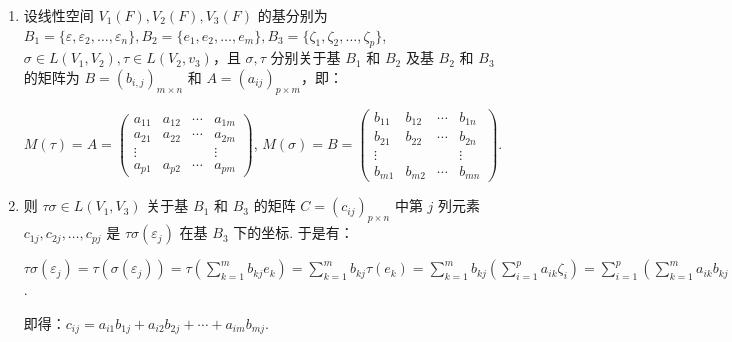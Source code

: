\begin{enumerate}
    \item 设线性空间 $V_1(F), V_2(F), V_3(F)$ 的基分别为 $B_1=\{\varepsilon, \varepsilon_2,\ldots,\varepsilon_n\},B_2=\{e_1,e_2,\ldots,e_m\},B_3=\{\zeta_1,\zeta_2,\ldots,\zeta_p\}$, $\sigma \in L(V_1,V_2), \tau \in L(V_2,v_3)$，且 $\sigma, \tau$ 分别关于基 $B_1$ 和 $B_2$ 及基 $B_2$ 和 $B_3$ 的矩阵为 $B=(b_{i,j})_{m \times n}$ 和 $A=(a_{ij})_{p\times m}$，即：

          $M(\tau)=A=\begin{pmatrix}
                  a_{11} & a_{12} & \cdots & a_{1m} \\
                  a_{21} & a_{22} & \cdots & a_{2m} \\
                  \vdots &        &        & \vdots \\
                  a_{p1} & a_{p2} & \cdots & a_{pm}
              \end{pmatrix}$,
          $M(\sigma)=B=\begin{pmatrix}
                  b_{11} & b_{12} & \cdots & b_{1n} \\
                  b_{21} & b_{22} & \cdots & b_{2n} \\
                  \vdots &        &        & \vdots \\
                  b_{m1} & b_{m2} & \cdots & b_{mn}
              \end{pmatrix}$.

    \item 则 $\tau\sigma \in L(V_1,V_3)$ 关于基 $B_1$ 和 $B_3$ 的矩阵 $C=(c_{ij})_{p\times n}$ 中第 $j$ 列元素 $c_{1j},c_{2j},\ldots,c_{pj}$ 是 $\tau\sigma(\varepsilon_j)$ 在基 $B_3$ 下的坐标. 于是有：

          $\tau\sigma(\varepsilon_j)=\tau(\sigma(\varepsilon_j))=\tau(\sum_{k=1}^{m}b_{kj}e_k)=\sum_{k=1}^{m}b_{kj}\tau(e_k)=\sum_{k=1}^{m}b_{kj}(\sum_{i=1}^{p}a_{ik}\zeta_i)=\sum_{i=1}^{p}(\sum_{k=1}^{m}a_{ik}b_{kj})\zeta_i$.

          即得：$c_{ij}=a_{i1}b_{1j}+a_{i2}b_{2j}+\cdots+a_{im}b_{mj}$.
\end{enumerate}

